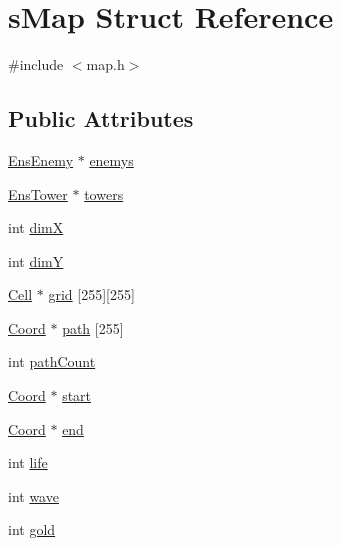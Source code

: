 \hypertarget{structs_map}{}\section{s\+Map Struct Reference}
\label{structs_map}


{\ttfamily \#include $<$map.\+h$>$}

\subsection*{Public Attributes}
\begin{DoxyCompactItemize}
\item 
\hyperlink{ens_enemy_8h_a26a6c5620b5248c6be80e179219bd489}{Ens\+Enemy} $\ast$ \hyperlink{structs_map_a7319b51da24fb022fa90806e9cd7bd76}{enemys}
\item 
\hyperlink{ens_tower_8h_a24777732150ac32528df3ba02a20a836}{Ens\+Tower} $\ast$ \hyperlink{structs_map_a93cab5b7e4f3205c43335147e2a3f066}{towers}
\item 
int \hyperlink{structs_map_a9ba71dc7a7b6eeb28048a66493c620d4}{dim\+X}
\item 
int \hyperlink{structs_map_a3f0d31fe9f43386379f2eece819cad01}{dim\+Y}
\item 
\hyperlink{map_8h_ae6d03ecef1dc8e54c2395164d3978fe5}{Cell} $\ast$ \hyperlink{structs_map_a5c09c94b17e9241ec28aba0407808aff}{grid} \mbox{[}255\mbox{]}\mbox{[}255\mbox{]}
\item 
\hyperlink{coordonates_8h_aff9d4468ac7a973ce7e5cfb5bd39bc33}{Coord} $\ast$ \hyperlink{structs_map_a7b410c58024a707229d3c7ec832bdf27}{path} \mbox{[}255\mbox{]}
\item 
int \hyperlink{structs_map_a1d8b95b78adb7ddb2381de089e870991}{path\+Count}
\item 
\hyperlink{coordonates_8h_aff9d4468ac7a973ce7e5cfb5bd39bc33}{Coord} $\ast$ \hyperlink{structs_map_aa50747972cf5e8c17c9927eb8b0439c7}{start}
\item 
\hyperlink{coordonates_8h_aff9d4468ac7a973ce7e5cfb5bd39bc33}{Coord} $\ast$ \hyperlink{structs_map_af32a1725ce537428fb1927a1fbb967fd}{end}
\item 
int \hyperlink{structs_map_a7ac656eb61c1fd86f15eb6a36df144e8}{life}
\item 
int \hyperlink{structs_map_abe7b6a265689239f6a6ffbcfd95508be}{wave}
\item 
int \hyperlink{structs_map_a2751a189d93f2aead4161dab37878ff2}{gold}
\end{DoxyCompactItemize}


